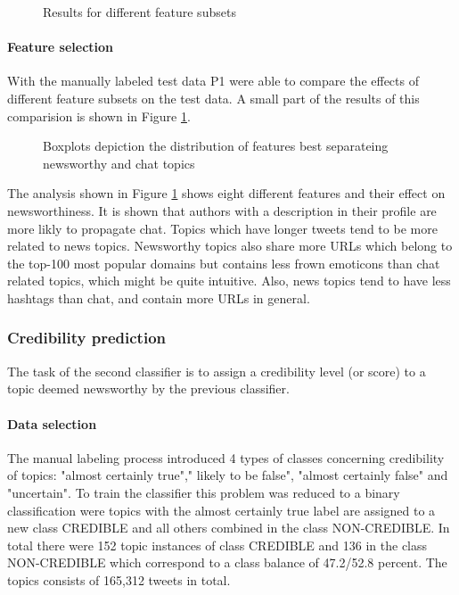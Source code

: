 \documentclass{proseminar}
\begin{document}
\begin{figure}[h]
\centering
{}
\caption{Results for different feature subsets}
\end{figure}

\paragraph{Feature selection}
With the manually labeled test data P1 were able to compare the effects of different feature subsets on the test data. A small part of the results of this comparision is shown in Figure \ref{fig:boxNews}.

\begin{figure}[h]
\centering
{}
\caption{Boxplots depiction the distribution of features best separateing newsworthy and chat topics}
\label{fig:boxNews}
\end{figure}

The analysis shown in Figure \ref{fig:boxNews} shows eight different features and their effect on newsworthiness. It is shown that authors with a description in their profile are more likly to propagate chat. 
Topics which have longer tweets tend to be more related to news topics. Newsworthy topics also share more URLs which belong to the top-100 most popular domains but contains less frown emoticons than chat related topics, which might be quite intuitive.
Also, news topics tend to have less hashtags than chat, and contain more URLs in general.


\subsubsection*{Credibility prediction}
The task of the second classifier is to assign a credibility level (or score) to a topic deemed newsworthy by the previous classifier.

\paragraph{Data selection}
The manual labeling process introduced 4 types of classes concerning credibility of topics:  "almost certainly true"," likely to be false",  "almost certainly false" and "uncertain". To train the classifier this problem was reduced to a binary classification were topics with the almost certainly true label are assigned to a new class CREDIBLE and all others combined in the class NON-CREDIBLE.
In total there were 152 topic instances of class CREDIBLE and 136 in the class NON-CREDIBLE which correspond to a class balance of 47.2/52.8 percent. The topics consists of  165,312 tweets in total. 
\end{document}
